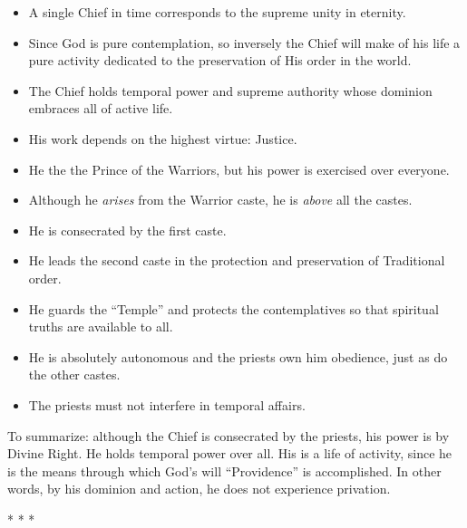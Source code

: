 \begin{itemize}


\item A single Chief in time corresponds to the supreme unity in eternity.

\item Since God is pure contemplation, so inversely the Chief will make of his life a pure activity dedicated to the preservation of His order in the world.

\item The Chief holds temporal power and supreme authority whose dominion embraces all of active life.

\item His work depends on the highest virtue: Justice.

\item He the the Prince of the Warriors, but his power is exercised over everyone.

\item Although he \emph{arises} from the Warrior caste, he is \emph{above} all the castes.

\item He is consecrated by the first caste.

\item He leads the second caste in the protection and preservation of Traditional order.

\item He guards the ``Temple'' and protects the contemplatives so that spiritual truths are available to all.

\item He is absolutely autonomous and the priests own him obedience, just as do the other castes.

\item The priests must not interfere in temporal affairs.
\end{itemize}


To summarize: although the Chief is consecrated by the priests, his power is by Divine Right. He holds temporal power over all. His is a life of activity, since he is the means through which God's will ``Providence'' is accomplished. In other words, by his dominion and action, he does not experience privation.



\begin{center}* * *\end{center}

